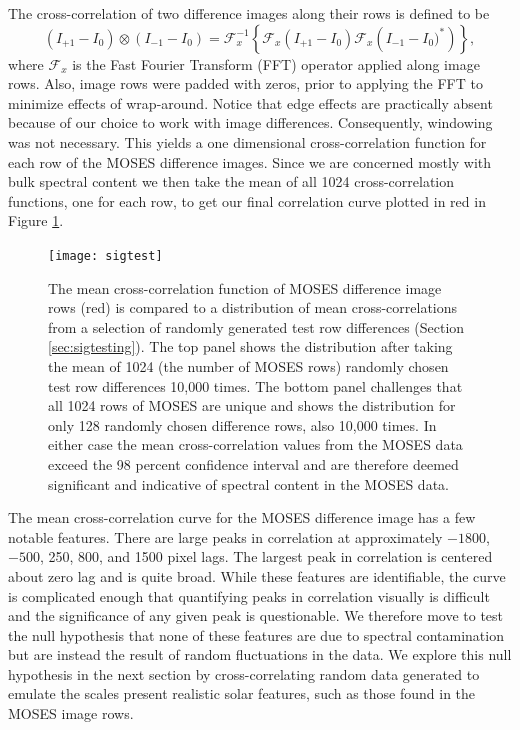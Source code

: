         The cross-correlation of two difference images along their rows is defined to be
        \begin{equation}
         \left(I_{+1}-I_0\right) \otimes \left(I_{-1}-I_0\right) = \mathcal{F}_x^{-1} \left\{\mathcal{F}_x\left(I_{+1}-I_0 \right)\mathcal{F}_x\left( I_{-1}-I_0)^* \right)  \right\},
         \label{eqn:cross_correlate}
        \end{equation}
        where $\mathcal{F}_x$ is the Fast Fourier Transform (FFT) operator applied along image rows.  
        Also, image rows were padded with zeros, prior to applying the FFT to minimize effects of wrap-around. 
        Notice that edge effects are practically absent because of our choice to work with image differences. 
        Consequently, windowing was not necessary.
        This yields a one dimensional cross-correlation function for each row of the MOSES difference images.  
        Since we are concerned mostly with bulk spectral content we then take the mean of all 1024 cross-correlation functions, one for each row, to get our final correlation curve plotted in red in Figure \ref{fig:sigtest}. 
		 
		 \begin{figure}
		 	\centering
		 	\texttt{[image: sigtest]}
            \caption{The mean cross-correlation function of MOSES difference image rows (red) is compared to a distribution of mean cross-correlations from a selection of randomly generated test row differences (Section \ref{sec:sigtesting}). 
            The top panel shows the distribution after taking the mean of 1024 (the number of MOSES rows) randomly chosen test row differences 10,000 times.  
            The bottom panel challenges that all 1024 rows of MOSES are unique and shows the distribution for only 128 randomly chosen difference rows, also 10,000 times.  
            In either case the mean cross-correlation values from the MOSES data exceed the 98 percent confidence interval and are therefore deemed significant and indicative of spectral content in the MOSES data.}
		 	\label{fig:sigtest}
		 \end{figure}
		 
	 
		 The mean cross-correlation curve for the MOSES difference image has a few notable features.  
		 There are large%
		 peaks in correlation  at approximately $-1800$, $-500$, 250, 800, and 1500 pixel lags.  
		 The largest peak in correlation is centered about zero lag and is quite broad.   
		 While these features are identifiable, the curve is complicated enough that quantifying peaks in correlation visually is difficult and the significance of any given peak is questionable. 
		 We therefore move to test the null hypothesis that none of these features are due to spectral contamination but are instead the result of random fluctuations in the data. 
		 We explore this null hypothesis in the next section by cross-correlating random data generated to emulate the scales present realistic solar features, such as those found in the MOSES image rows.
 
